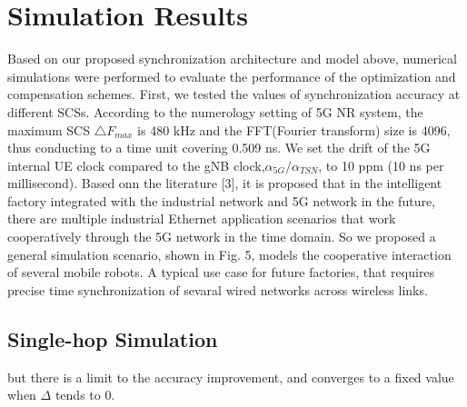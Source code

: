 \documentclass[english]{cccconf}
\begin{document}
\section{Simulation Results}
Based on our proposed synchronization architecture and model above, numerical simulations were performed to evaluate the performance of the optimization and compensation schemes. First, we tested the values of synchronization accuracy at different SCSs. According to the numerology setting of 5G NR system\cite{access2015requirements}, the maximum SCS $\triangle F_{max}$ is 480 kHz and the FFT(Fourier transform) size is 4096, thus conducting to a time unit covering 0.509 ns. We set the drift of the 5G internal UE clock compared to the gNB clock,$\alpha_{5G}/\alpha_{TSN}$, to 10 ppm (10 ns per millisecond).
Based onn the literature [3], it is proposed that in the intelligent factory integrated with the industrial network and 5G network in the future, there are multiple industrial Ethernet application scenarios that work cooperatively through the 5G network in the time domain. So we proposed a general simulation scenario, shown in Fig. 5, models the cooperative interaction of several mobile robots. A typical use case for future factories, that requires precise time synchronization of sevaral wired networks across wireless links.

\subsection{Single-hop Simulation}

but there is a limit to the accuracy improvement, and converges to a fixed value when $\Delta$ tends to 0.
\end{document}
